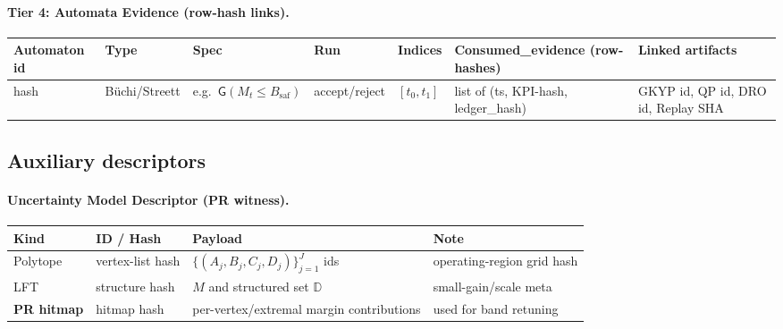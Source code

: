 \paragraph{Tier 4: Automata Evidence (row-hash links).}
\begin{center}
\renewcommand{\arraystretch}{1.12}
\begin{tabularx}{\textwidth}{@{} l l l l X X X @{}}
\toprule
\textbf{Automaton id} & \textbf{Type} & \textbf{Spec} & \textbf{Run} & \textbf{Indices} & \textbf{Consumed\_evidence (row-hashes)} & \textbf{Linked artifacts} \\
\midrule
hash & Büchi/Streett & e.g.\ $\textsf{G}(M_t\le B_{\mathrm{saf}})$ & accept/reject & $[t_0,t_1]$ & list of (ts, KPI-hash, ledger\_hash) & GKYP id, QP id, DRO id, Replay SHA \\
\bottomrule
\end{tabularx}
\end{center}

\subsection{Auxiliary descriptors}

\paragraph{Uncertainty Model Descriptor (PR witness).}
\begin{center}
\renewcommand{\arraystretch}{1.12}
\begin{tabularx}{\textwidth}{@{} l l X X @{}}
\toprule
\textbf{Kind} & \textbf{ID / Hash} & \textbf{Payload} & \textbf{Note} \\
\midrule
Polytope & vertex-list hash & $\{(A_j,B_j,C_j,D_j)\}_{j=1}^J$ ids & operating-region grid hash \\
LFT & structure hash & $M$ and structured set $\mathbb D$ & small-gain/scale meta \\
\textbf{PR hitmap} & hitmap hash & per-vertex/extremal margin contributions & used for band retuning \\
\bottomrule
\end{tabularx}
\end{center}

